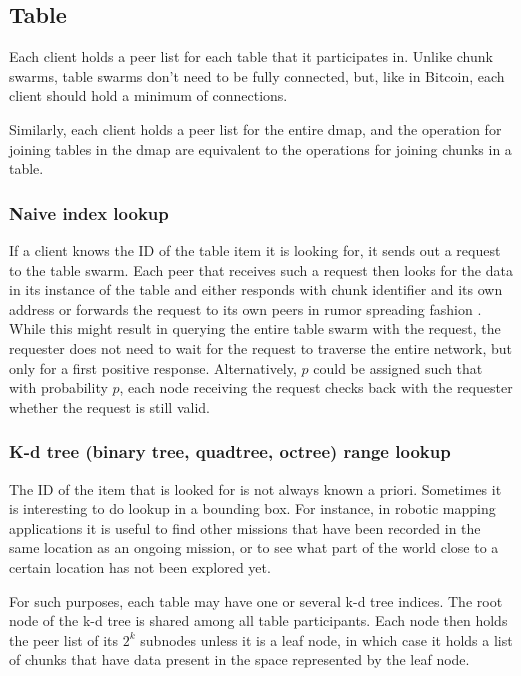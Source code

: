 \documentclass[a4paper, 10pt, conference]{ieeeconf}
\begin{document}
\subsection{Table}

Each client holds a peer list for each table that it participates in. Unlike
chunk swarms, table swarms don't need to be fully connected, but, like in
Bitcoin, each client should hold a minimum of connections.

Similarly, each client holds a peer list for the entire dmap, and the
operation for joining tables in the dmap are equivalent to the operations for
joining chunks in a table.

\subsubsection{Naive index lookup}

If a client knows the ID of the table item it is looking for, it sends out a
request to the table swarm. Each peer that receives such a request then looks 
for the data in its instance of the table and either responds with chunk
identifier and its own address or forwards the request to its own peers in
rumor spreading fashion \cite{bitcoin}. While this might result in querying the
entire table swarm with the request, the requester does not need to wait for the
request to traverse the entire network, but only for a first positive response.
Alternatively, $p$ could be assigned such that with probability $p$, each node
receiving the request checks back with the requester whether the request is
still valid.

\subsubsection{K-d tree (binary tree, quadtree, octree) range lookup}

The ID of the item that is looked for is not always known a priori. Sometimes
it is interesting to do lookup in a bounding box. For instance, in robotic
mapping applications it is useful to find other missions that have been recorded
in the same location as an ongoing mission, or to see what part of the
world close to a certain location has not been explored yet.

For such purposes, each table may have one or several k-d tree indices.
The root node of the k-d tree is shared among all table participants. Each
node then holds the peer list of its $2^k$ subnodes unless it is a leaf node,
in which case it holds a list of chunks that have data present in the space
represented by the leaf node.
\end{document}

